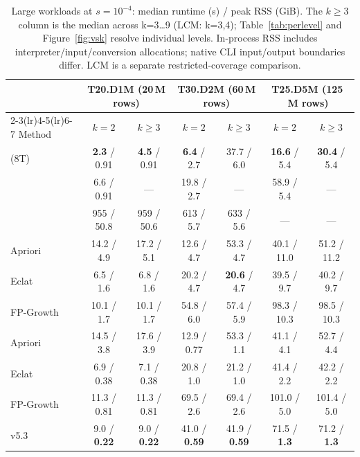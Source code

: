 \begin{table}[t]
\caption{Large workloads at $s=10^{-4}$: median runtime (s) / peak RSS (GiB). The $k\ge3$ column is the median across k=3\ldots9 (LCM: k=3,4); Table~\ref{tab:perlevel} and Figure~\ref{fig:vsk} resolve individual levels. In-process RSS includes interpreter/input/conversion allocations; native CLI input/output boundaries differ. LCM is a separate restricted-coverage comparison.}\label{tab:bigdata}
\small\setlength{\tabcolsep}{4pt}
\begin{tabular*}{\textwidth}{@{\extracolsep{\fill}}lcccccc@{}}
\toprule
& \multicolumn{2}{c}{T20.D1M (20\,M rows)} & \multicolumn{2}{c}{T30.D2M (60\,M rows)} & \multicolumn{2}{c}{T25.D5M (125\,M rows)}\\
\cmidrule(lr){2-3}\cmidrule(lr){4-5}\cmidrule(lr){6-7}
Method & $k=2$ & $k\ge3$ & $k=2$ & $k\ge3$ & $k=2$ & $k\ge3$\\
\midrule
\fast{} (8T)            & \textbf{2.3} / 0.91 & \textbf{4.5} / 0.91 & \textbf{6.4} / 2.7 & 37.7 / 6.0 & \textbf{16.6} / 5.4 & \textbf{30.4} / 5.4\\
\fastoneT{}             & 6.6 / 0.91 & --- & 19.8 / 2.7 & --- & 58.9 / 5.4 & ---\\
\classic{}              & 955 / 50.8 & 959 / 50.6 & 613 / 5.7 & 633 / 5.6 & --- & ---\\
\pyfim{} Apriori        & 14.2 / 4.9 & 17.2 / 5.1 & 12.6 / 4.7 & 53.3 / 4.7 & 40.1 / 11.0 & 51.2 / 11.2\\
\pyfim{} Eclat          & 6.5 / 1.6 & 6.8 / 1.6 & 20.2 / 4.7 & \textbf{20.6} / 4.7 & 39.5 / 9.7 & 40.2 / 9.7\\
\pyfim{} FP-Growth      & 10.1 / 1.7 & 10.1 / 1.7 & 54.8 / 6.0 & 57.4 / 5.9 & 98.3 / 10.3 & 98.5 / 10.3\\
\borgelt{} Apriori      & 14.5 / 3.8 & 17.6 / 3.9 & 12.9 / 0.77 & 53.3 / 1.1 & 41.1 / 4.1 & 52.7 / 4.4\\
\borgelt{} Eclat        & 6.9 / 0.38 & 7.1 / 0.38 & 20.8 / 1.0 & 21.2 / 1.0 & 41.4 / 2.2 & 42.2 / 2.2\\
\borgelt{} FP-Growth    & 11.3 / 0.81 & 11.3 / 0.81 & 69.5 / 2.6 & 69.4 / 2.6 & 101.0 / 5.0 & 101.4 / 5.0\\
\lcm{} v5.3             & 9.0 / \textbf{0.22} & 9.0 / \textbf{0.22} & 41.0 / \textbf{0.59} & 41.9 / \textbf{0.59} & 71.5 / \textbf{1.3} & 71.2 / \textbf{1.3}\\
\bottomrule
\end{tabular*}
\end{table}
